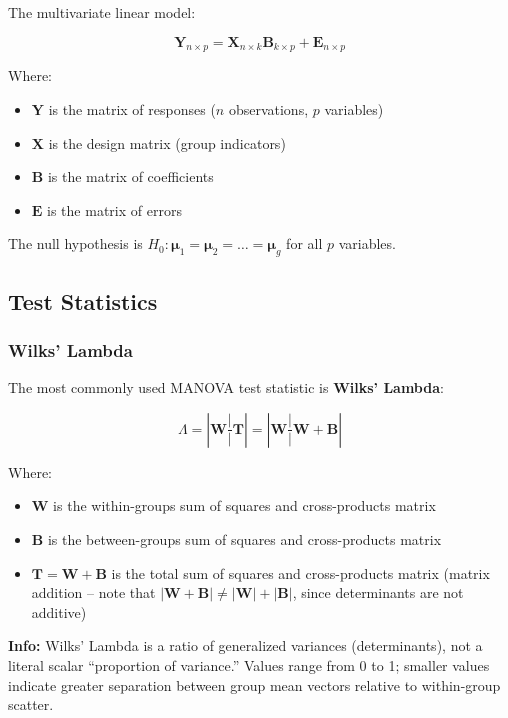 \documentclass[
]{article}
\begin{document}
The multivariate linear model:

\[\mathbf{Y}_{n \times p} = \mathbf{X}_{n \times k}\mathbf{B}_{k \times p} + \mathbf{E}_{n \times p}\]

Where:

\begin{itemize}
\item
  \(\mathbf{Y}\) is the matrix of responses (\(n\) observations, \(p\)
  variables)
\item
  \(\mathbf{X}\) is the design matrix (group indicators)
\item
  \(\mathbf{B}\) is the matrix of coefficients
\item
  \(\mathbf{E}\) is the matrix of errors
\end{itemize}

The null hypothesis is
\(H_{0}:\mathbf{\mu}_{1} = \mathbf{\mu}_{2} = \ldots = \mathbf{\mu}_{g}\)
for all \(p\) variables.

\textbf{ }

\subsection{Test Statistics}

\subsubsection{Wilks' Lambda}

The most commonly used MANOVA test statistic is \textbf{Wilks' Lambda}:

\[\Lambda = |\mathbf{W}\frac{|}{|}\mathbf{T}| = |\mathbf{W}\frac{|}{|}\mathbf{W} + \mathbf{B}|\]

Where:

\begin{itemize}
\item
  \(\mathbf{W}\) is the within-groups sum of squares and cross-products
  matrix
\item
  \(\mathbf{B}\) is the between-groups sum of squares and cross-products
  matrix
\item
  \(\mathbf{T} = \mathbf{W} + \mathbf{B}\) is the total sum of squares
  and cross-products matrix (matrix addition -- note that
  \(|\mathbf{W} + \mathbf{B}| \neq |\mathbf{W}| + |\mathbf{B}|\), since
  determinants are not additive)
\end{itemize}

\textbf{Info: } Wilks' Lambda is a ratio of generalized variances
(determinants), not a literal scalar ``proportion of variance.'' Values
range from 0 to 1; smaller values indicate greater separation between
group mean vectors relative to within-group scatter.
\end{document}
